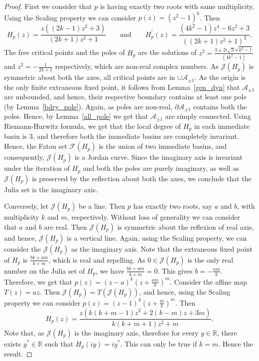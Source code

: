 \documentclass[12pt]{article}
\begin{document}
\begin{proof}
First we consider that $p$ is having exactly two roots with same multiplicity. Using the Scaling property we can consider $p(z)=\left(z^{2}-1\right)^{k}$. Then	$$
H_{p}(z)=\frac{z\left((2 k-1) z^{2}+3\right)}{(2 k+1) z^{2}+1}\qquad\text{and}\qquad H_{p}^{\prime}(z)=\frac{\left(4 k^{2}-1\right) z^{4}-6 z^{2}+3}{\left((2 k+1) z^{2}+1\right)^{2}}.
$$
The free critical points and the poles of $H_p$ are the solutions of
$ z^{2}=\frac{3 \pm 2i \sqrt{3} \sqrt{k^{2}-1}}{\left(4 k^{2}-1\right)}$ and $z^2=- \frac{1}{2k+1}$ respectively, which are non-real complex numbers.
As $\mathcal{J}(H_{p})$ is symmetric about both the axes, all critical points are in $\cup \mathcal{A}_{ \pm 1}$. As the origin is the only finite extraneous fixed point, it follows from Lemma~\ref{gen_dyn} that
$\mathcal{A}_{ \pm 1}$ are unbounded, and hence, their respective boundary contains at least one pole (by Lemma~\ref{bdry_pole}). Again, as poles are non-real, $\partial \mathcal{A}_{ \pm 1}$ contains both the poles. Hence, by Lemma~\ref{all_pole} we get that
$\mathcal{A}_{\pm 1}$ are simply connected. Using Riemann-Hurwitz formula, we get that the local degree of $H_p$ in each immediate basin is $3$, and therefore both the immediate basins are completely invariant. Hence, the Fatou set $\mathcal{F}(H_p)$ is the union of two immediate basins, and consequently, $\mathcal{J}(H_p)$ is a Jordan curve. Since the imaginary axis is invariant under the iteration of $H_{p}$ and both the poles are purely imaginary, as well as $\mathcal{J}(H_p)$ is preserved by the reflection about both the axes, we conclude that the Julia set is the imaginary axis.
\par
Conversely, let $\mathcal{J}(H_p)$ be a line.
Then $ p$ has exactly two roots, say $a$ and $b$, with multiplicity $k$ and $m$, respectively. Without loss of generality we can consider that $a$ and $ b$ are real.
Then $\mathcal{J}(H_p)$ is symmetric about the reflexion of real axis, and hence, $\mathcal{J}(H_{p})$ is a vertical line.
Again, using the Scaling property, we can consider the $\mathcal{J}(H_{p})$ as the imaginary axis. Note that the extraneous fixed point of $H_p$ is $\frac{b k+a m}{k+m}$, which is real and repelling. As $0 \in \mathcal{J}(H_p)$ is the only real number on the Julia set of $H_p$, we have
$
\frac{b k+a m}{k+m}=0$. This gives $b=-\frac{a m}{k} .
$
Therefore, we get that $ p(z)=(z-a)^{k}\left(z+\frac{a m}{k}\right)^{m} .
$ Consider the affine map $T(z)=a z$. Then $\mathcal{J}\left(H_{p}\right)=T\left(\mathcal{J}\left(H_{p}\right)\right)$, and hence, using the Scaling property we can consider
$
p(z)=(z-1)^{k}\left(z+\frac{m}{k}\right)^{m} .
$
Then $$H_{p}(z)=\frac{z\left(k(k+m-1) z^{2}+2(k-m) z+3 m\right)}{k(k+m+1) z^{2}+m}.$$
Note that, as $\mathcal{J}(H_{p})$ is the imaginary axis, therefore for every $y \in \mathbb{R}$, there exists $y^{*} \in \mathbb{R}$ such that
$H_{p}(i y)=i y^{*}.$
This can only be true if $k=m$.
Hence the result.
\end{proof}
\end{document}
